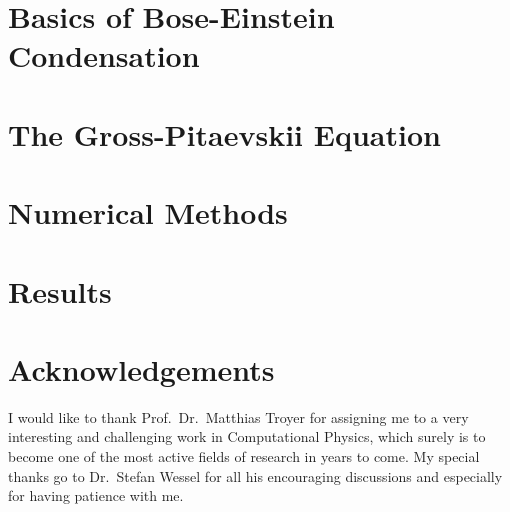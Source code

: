 \documentclass[12pt]{book}
\begin{document}
\chapter{Basics of Bose-Einstein Condensation}\label{ch:BEC}



\chapter{The Gross-Pitaevskii Equation}


%

\chapter{Numerical Methods}


\chapter{Results}


\chapter*{Acknowledgements}
I would like to thank Prof.~Dr.~Matthias Troyer for assigning me to a very interesting and challenging work in Computational Physics, which surely is to become one of the most active fields of research in years to come. My special thanks go to Dr.~Stefan Wessel for all his encouraging discussions and especially for having patience with me.

\listoffigures

\end{document}
